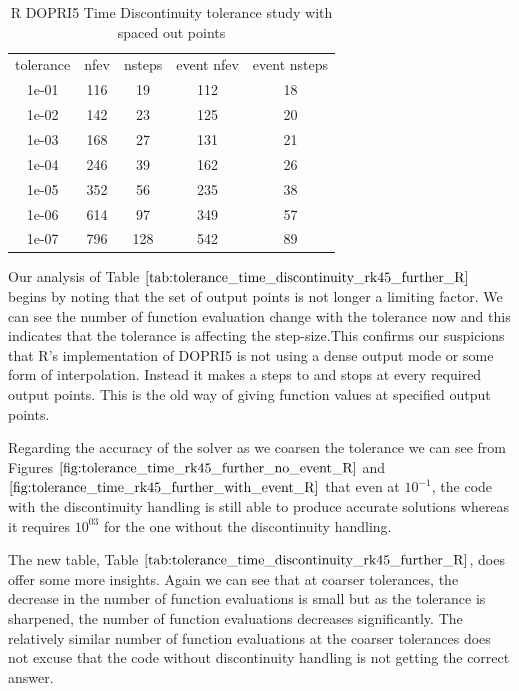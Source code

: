 \begin{table}[h]
\caption {R DOPRI5 Time Discontinuity tolerance study with spaced out points} \label{tab:tolerance_time_discontinuity_rk45_further_R} 
\begin{center}
\begin{tabular}{ c c c c c }
tolerance & nfev & nsteps & event nfev & event nsteps \\ 
1e-01 & 116 &  19 & 112 & 18 \\
1e-02 & 142 &  23 & 125 & 20 \\
1e-03 & 168 &  27 & 131 & 21 \\
1e-04 & 246 &  39 & 162 & 26 \\
1e-05 & 352 &  56 & 235 & 38 \\
1e-06 & 614 &  97 & 349 & 57 \\
1e-07 & 796 & 128 & 542 & 89 \\
\end{tabular}
\end{center}
\end{table}

Our analysis of Table $\ref{tab:tolerance_time_discontinuity_rk45_further_R}$ begins by noting that the set of output points is not longer a limiting factor. We can see the number of function evaluation change with the tolerance now and this indicates that the tolerance is affecting the step-size.This confirms our suspicions that R's implementation of DOPRI5 is not using a dense output mode or some form of interpolation. Instead it makes a steps to and stops at every required output points. This is the old way of giving function values at specified output points. 

Regarding the accuracy of the solver as we coarsen the tolerance we can see from Figures $\ref{fig:tolerance_time_rk45_further_no_event_R}$ and $\ref{fig:tolerance_time_rk45_further_with_event_R}$ that even at $10^{-1}$, the code with the discontinuity handling is still able to produce accurate solutions whereas it requires $10^{03}$ for the one without the discontinuity handling.

The new table, Table $\ref{tab:tolerance_time_discontinuity_rk45_further_R}$, does offer some more insights. Again we can see that at coarser tolerances, the decrease in the number of function evaluations is small but as the tolerance is sharpened, the number of function evaluations decreases significantly. The relatively similar number of function evaluations at the coarser tolerances does not excuse that the code without discontinuity handling is not getting the correct answer. 

